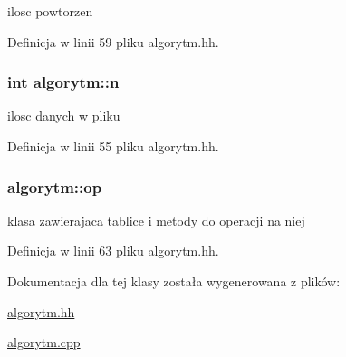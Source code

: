 ilosc powtorzen 



\-Definicja w linii 59 pliku algorytm.\-hh.

\hypertarget{classalgorytm_a2778c37f0ec06a30b7d494501c40e91a}{
\subsubsection[{n}]{\setlength{\rightskip}{0pt plus 5cm}int {\bf algorytm\-::n}}}\label{classalgorytm_a2778c37f0ec06a30b7d494501c40e91a}


ilosc danych w pliku 



\-Definicja w linii 55 pliku algorytm.\-hh.

\hypertarget{classalgorytm_aedaee1aa41206b5f050fe660d0846f2d}{
\subsubsection[{op}]{ {\bf algorytm\-::op}}}\label{classalgorytm_aedaee1aa41206b5f050fe660d0846f2d}


klasa zawierajaca tablice i metody do operacji na niej 



\-Definicja w linii 63 pliku algorytm.\-hh.



\-Dokumentacja dla tej klasy została wygenerowana z plików\-:\begin{DoxyCompactItemize}
\item 
\hyperlink{algorytm_8hh}{algorytm.\-hh}\item 
\hyperlink{algorytm_8cpp}{algorytm.\-cpp}\end{DoxyCompactItemize}
